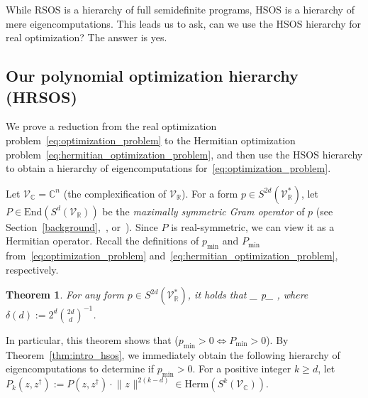\documentclass[11pt]{article}
\newtheorem{theorem}{Theorem}
\numberwithin{theorem}{section}
\theoremstyle{definition}
\newcommand{\tinyspace}{\mspace{1mu}}
\newcommand{\norm}[1]{\lVert\tinyspace #1 \tinyspace\rVert}
\newcommand{\setft}[1]{\mathrm{#1}}
\newcommand{\Herm}{\setft{Herm}}
\newcommand{\complex}{\mathbb{C}}
\newcommand{\real}{\mathbb{R}}
\newcommand{\integer}{\mathbb{Z}}
\newcommand\V{\mathcal{V}}
\newcommand{\End}{\setft{End}}
\newcommand{\dg}{\dagger}
\newcommand{\bfalpha}{\boldsymbol{\alpha}}
\newcommand{\bfbeta}{\boldsymbol{\beta}}
\def\ba#1\ea{\begin{align}#1\end{align}}
\newcommand{\Vc}{\V_{\complex}}
\newcommand{\Vr}{\V_{\real}}
\newcommand{\pmin}{p_{\min}}
\newcommand{\Pmin}{P_{\min}}
\begin{document}
While RSOS is a hierarchy of full semidefinite programs, HSOS is a hierarchy of mere eigencomputations. This leads us to ask, can we use the HSOS hierarchy for real optimization? The answer is yes.

\subsection{Our polynomial optimization hierarchy (HRSOS)}
We prove a reduction from the real optimization problem~\eqref{eq:optimization_problem} to the Hermitian optimization problem~\eqref{eq:hermitian_optimization_problem}, and then use the HSOS hierarchy to obtain a hierarchy of eigencomputations for~\eqref{eq:optimization_problem}.

Let $\V_{\complex}=\complex^n$ (the complexification of $\Vr$). For a form $p \in S^{2d}(\Vr^*)$, let $P \in \End(S^d(\Vr))$ be the \textit{maximally symmetric Gram operator} of $p$ (see Section~\ref{background},~\cite[Section 3]{doherty2012convergence}, or~\cite[Lemma 1.2]{laurent2019notes}). Since $P$ is real-symmetric, we can view it as a Hermitian operator. Recall the definitions of $p_{\min}$ and $P_{\min}$ from~\eqref{eq:optimization_problem} and~\eqref{eq:hermitian_optimization_problem}, respectively.




\begin{theorem}\label{thm:intro_reduction}
For any form $p \in S^{2d}(\Vr^*)$, it holds that
\ba
P_{\min} \leq p_{\min} \leq {},
\ea
where $\delta(d):={2^d}{\binom{2d}{d}^{-1}}$.
\end{theorem}

In particular, this theorem shows that ($\pmin > 0 \iff \Pmin > 0$). By Theorem~\ref{thm:intro_hsos}, we immediately obtain the following hierarchy of eigencomputations to determine if $\pmin>0$. For a positive integer $k \geq d$, let $P_k(z,z^\dg) := P(z,z^\dg) \cdot \norm{z}^{2(k-d)}\in \Herm(S^{k}(\Vc))$.
\end{document}
